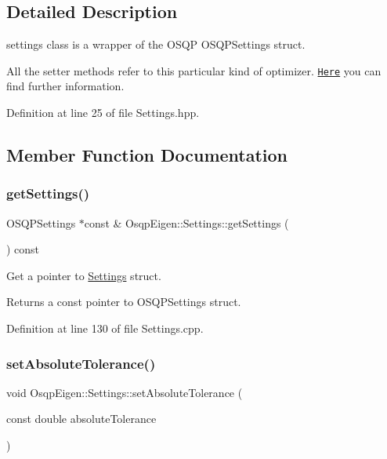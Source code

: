 \subsection{Detailed Description}
settings class is a wrapper of the O\+S\+QP O\+S\+Q\+P\+Settings struct. 

All the setter methods refer to this particular kind of optimizer. \href{http://web.stanford.edu/~boyd/admm.html}{\tt Here} you can find further information. 

Definition at line 25 of file Settings.\+hpp.



\subsection{Member Function Documentation}
\mbox{\label{classOsqpEigen_1_1Settings_a306790b26968dde8dcd042fe48d2d924}} 
\subsubsection{\texorpdfstring{get\+Settings()}{getSettings()}}
{\footnotesize\ttfamily O\+S\+Q\+P\+Settings $\ast$const  \& Osqp\+Eigen\+::\+Settings\+::get\+Settings (\begin{DoxyParamCaption}{ }\end{DoxyParamCaption}) const}



Get a pointer to \mbox{\hyperlink{classOsqpEigen_1_1Settings}{Settings}} struct. 

\begin{DoxyReturn}{Returns}
a const pointer to O\+S\+Q\+P\+Settings struct. 
\end{DoxyReturn}


Definition at line 130 of file Settings.\+cpp.

\mbox{\label{classOsqpEigen_1_1Settings_a4498f6973031eadb2ad94b60dc856651}} 
\subsubsection{\texorpdfstring{set\+Absolute\+Tolerance()}{setAbsoluteTolerance()}}
{\footnotesize\ttfamily void Osqp\+Eigen\+::\+Settings\+::set\+Absolute\+Tolerance (\begin{DoxyParamCaption}\item[{const double}]{absolute\+Tolerance }\end{DoxyParamCaption})}



